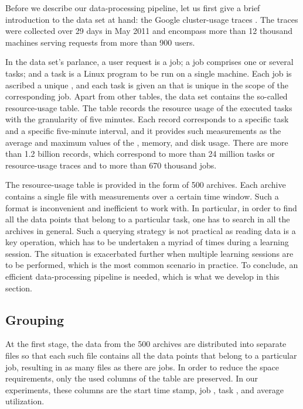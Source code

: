 Before we describe our data-processing pipeline, let us first give a brief
introduction to the data set at hand: the Google cluster-usage traces
\cite{reiss2011}. The traces were collected over 29 days in May 2011 and
encompass more than 12 thousand machines serving requests from more than 900
users.

In the data set's parlance, a user request is a job; a job comprises one or
several tasks; and a task is a Linux program to be run on a single machine.
Each job is ascribed a unique , and each task is given an  that is
unique in the scope of the corresponding job. Apart from other tables, the data
set contains the so-called resource-usage table. The table records the resource
usage of the executed tasks with the granularity of five minutes. Each record
corresponds to a specific task and a specific five-minute interval, and it
provides such measurements as the average and maximum values of the ,
memory, and disk usage. There are more than 1.2 billion records, which
correspond to more than 24 million tasks or resource-usage traces and to more
than 670 thousand jobs.

The resource-usage table is provided in the form of 500 archives. Each archive
contains a single  file with measurements over a certain time window.
Such a format is inconvenient and inefficient to work with. In particular, in
order to find all the data points that belong to a particular task, one has to
search in all the archives in general. Such a querying strategy is not practical
as reading data is a key operation, which has to be undertaken a myriad of times
during a learning session. The situation is exacerbated further when multiple
learning sessions are to be performed, which is the most common scenario in
practice. To conclude, an efficient data-processing pipeline is needed, which is
what we develop in this section.

\subsection{Grouping} 
At the first stage, the  data from the 500 archives are distributed into
separate  files so that each such file contains all the data points that
belong to a particular job, resulting in as many  files as there are
jobs. In order to reduce the space requirements, only the used columns of the
table are preserved. In our experiments, these columns are the start time stamp,
job , task , and average  utilization.

